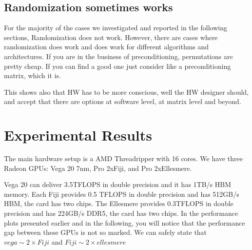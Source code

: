 \documentclass[manuscript,screen]{acmart}
\begin{document}
\subsection{Randomization sometimes works}

For the majority of the cases we investigated and reported in the
following sections, Randomization does not work. However, there are
cases where randomization does work and does work for different
algorithms and architectures. If you are in the business of
preconditioning, permutations are pretty cheap. If you can find a good
one just consider like a preconditioning matrix, which it is. 

This shows also that HW has to be more conscious, well the HW designer
should, and accept that there are options at software level, at matrix
level and beyond. 




\section{Experimental Results}
\label{sec:experimentalresults}
The main hardware setup is a AMD Threadripper with 16 cores. We have
three Radeon GPUs: Vega 20 7nm, Pro 2xFiji, and Pro 2xEllesmere.

Vega 20 can deliver 3.5TFLOPS in double precision and it has 1TB/s HBM
memory. Each Fiji provides 0.5 TFLOPS in double precision and has
512GB/s HBM, the card has two chips.  The Ellesmere provides 0.3TFLOPS
in double precision and has 224GB/s DDR5, the card has two chips. In
the performance plots presented earlier and in the following, you will
notice that the performance gap between these GPUs is not so
marked. We can safely state that $vega \sim 2\times Fiji$ and $Fiji \sim
2\times ellesmere$
\end{document}
